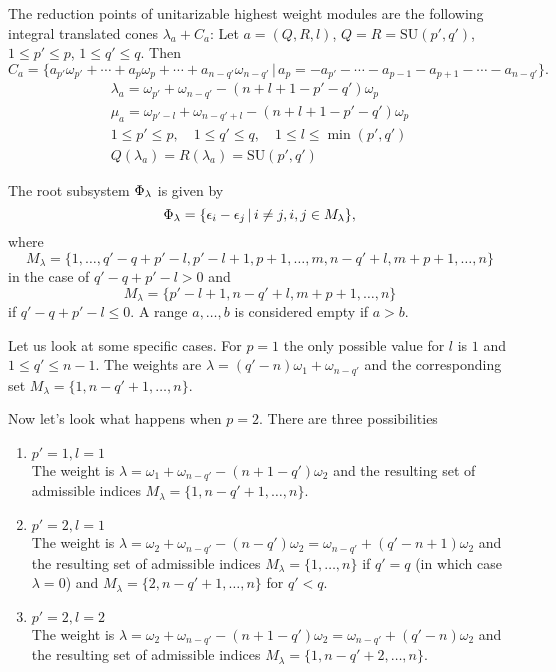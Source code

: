 \documentclass[12pt,a4paper,final]{report}
\begin{document}
The reduction points of unitarizable highest weight modules are the following integral translated cones $\lambda_a + C_a$:
Let $a=(Q,R,l)$, $Q=R=\mathrm{SU}(p',q')$, $1\leq p' \leq p$, $1\leq q'\leq q$. Then
\[
 C_a = \{a_{p'}\omega_{p'} + \cdots + a_p\omega_p + \cdots + a_{n-q'}\omega_{n-q'} \,|\, a_p=-a_{p'}-\cdots -a_{p-1}-a_{p+1} - \cdots - a_{n-q'} \}.
\]
\begin{gather*}
  \lambda_a=\omega_{p'} + \omega_{n-q'} - (n+l+1-p'-q')\omega_p   \\
  \mu_a = \omega_{p'-l}+\omega_{n-q'+l}-(n+l+1-p'-q')\omega_p\\
  1\leq p' \leq p,\quad 1\leq q' \leq q,\quad 1\leq l \leq \min(p',q')\\
  Q(\lambda_a)=R(\lambda_a)=\mathrm{SU}(p',q')
\end{gather*}

The root subsystem $\Phi_\lambda$ is given by
\[
 \Phi_\lambda = \{ \epsilon_i - \epsilon_j \,|\, i\neq j, i,j\in M_\lambda \},
\]
where \[
 M_\lambda =  \{ 1,\ldots, q'-q+p'-l, p'-l+1, p+1,\ldots,m, n-q'+l,m+p+1,\ldots,n\}
\]
in the case of $q'-q+p'-l > 0$ and
\[
  M_\lambda =  \{p'-l+1,n-q'+l,m+p+1,\ldots,n\}
\]
if $q'-q+p'-l \leq 0.$ A range $a,\ldots,b$ is considered empty if $a>b$.

Let us look at some specific cases. For $p=1$ the only possible value for $l$ is $1$ and $1\leq q' \leq n-1$. The weights are $\lambda = (q'-n)\omega_1 + \omega_{n-q'}$ and the corresponding set $M_\lambda = \{ 1,n-q'+1,\ldots,n \}$.

Now let's look what happens when $p=2$. There are three possibilities
\begin{enumerate}
 \item $p'=1, l=1$\\
 The weight is $\lambda=\omega_1+\omega_{n-q'}-(n+1-q')\omega_2$ and the resulting set of admissible indices $M_\lambda = \{1,n-q'+1,\ldots,n\}$.
 \item $p'=2, l=1$\\
 The weight is $\lambda=\omega_2+\omega_{n-q'}-(n-q')\omega_2 = \omega_{n-q'} + (q'-n+1)\omega_2$ and the resulting set of admissible indices $M_\lambda = \{1,\ldots,n\}$ if $q'=q$ (in which case $\lambda = 0$) and $M_\lambda = \{2,n-q'+1,\ldots,n\}$ for $q'<q$.
 \item $p'=2, l=2$\\
 The weight is $\lambda=\omega_2+\omega_{n-q'}-(n+1-q')\omega_2 = \omega_{n-q'}+(q'-n)\omega_2$ and the resulting set of admissible indices $M_\lambda = \{1,n-q'+2,\ldots,n\}$.
\end{enumerate}
\end{document}
